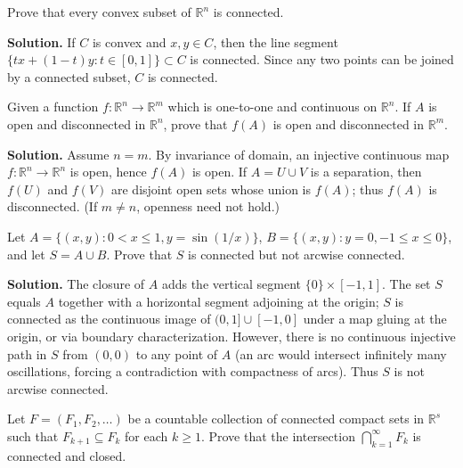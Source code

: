 \begin{problembox}
Prove that every convex subset of $\mathbb{R}^n$ is connected.
\end{problembox}

\noindent\textbf{Solution.}
If $C$ is convex and $x,y\in C$, then the line segment $\{tx+(1-t)y: t\in[0,1]\}\subset C$ is connected. Since any two points can be joined by a connected subset, $C$ is connected.
\medskip

\begin{problembox}
Given a function $f : \mathbb{R}^n \to \mathbb{R}^m$ which is one-to-one and continuous on $\mathbb{R}^n$. If $A$ is open and disconnected in $\mathbb{R}^n$, prove that $f(A)$ is open and disconnected in $\mathbb{R}^m$.
\end{problembox}

\noindent\textbf{Solution.}
Assume $n=m$. By invariance of domain, an injective continuous map $f:\mathbb{R}^n\to\mathbb{R}^n$ is open, hence $f(A)$ is open. If $A=U\cup V$ is a separation, then $f(U)$ and $f(V)$ are disjoint open sets whose union is $f(A)$; thus $f(A)$ is disconnected. (If $m\ne n$, openness need not hold.)
\medskip

\begin{problembox}
Let $A = \{(x, y) : 0 < x \leq 1, y = \sin(1/x)\}$, $B = \{(x, y) : y = 0, -1 \leq x \leq 0\}$, and let $S = A \cup B$. Prove that $S$ is connected but not arcwise connected.
\end{problembox}

\noindent\textbf{Solution.}
The closure of $A$ adds the vertical segment $\{0\}\times[-1,1]$. The set $S$ equals $A$ together with a horizontal segment adjoining at the origin; $S$ is connected as the continuous image of $(0,1]\cup[-1,0]$ under a map gluing at the origin, or via boundary characterization. However, there is no continuous injective path in $S$ from $(0,0)$ to any point of $A$ (an arc would intersect infinitely many oscillations, forcing a contradiction with compactness of arcs). Thus $S$ is not arcwise connected.
\medskip

\begin{problembox}
Let $F = (F_1, F_2, \ldots)$ be a countable collection of connected compact sets in $\mathbb{R}^s$ such that $F_{k+1} \subseteq F_k$ for each $k \geq 1$. Prove that the intersection $\bigcap_{k=1}^{\infty} F_k$ is connected and closed.
\end{problembox}

